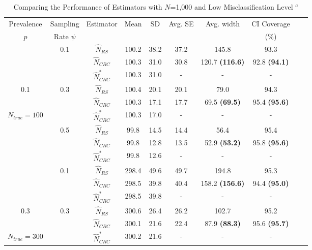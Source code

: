 \documentclass[useAMS,usenatbib,referee]{biom}
\begin{document}
\begin{table}
    \centering
    \caption{Comparing the Performance of Estimators with $N$=1,000 and Low Misclassification Level $^a$ }
    \label{table_2}
    \begin{threeparttable}[b]
    \begin{tabular}{cccccccccc}
    \hline
    Prevalence & 
    Sampling &  \multirow{2}{*}{Estimator \tnote{b}} & \multirow{2}{*}{Mean} & \multirow{2}{*}{SD} & \multirow{2}{*}{Avg. SE} & \multirow{2}{*}{Avg. width \tnote{c}} & CI Coverage  \\
    $p$ & Rate $\psi$ & &&&&& (\%)  \\ \hline
     & \multirow{3}{*}{0.1} & $\hat{N}_{RS}$ & 100.2 & 38.2 & 37.2 & 145.8 & 93.3  \\ \cline{3-8}
     & ~ & $\hat{N}_{CRC}$ & 100.3 & 31.0 & 30.8 & 120.7 \textbf{(116.6)} & 92.8 \textbf{(94.1)}  \\ \cline{3-8}
     & ~ & $\hat{N}_{CRC}^*$ & 100.3 & 31.0 & - & - & -   \\ \cline{2-8}
    
    0.1 & \multirow{3}{*}{0.3}  & $\hat{N}_{RS}$ & 100.4 & 20.1 & 20.1 & 79.0 & 94.3  \\ \cline{3-8}
     & ~ & $\hat{N}_{CRC}$ & 100.3 & 17.1 & 17.7 & 69.5 \textbf{(69.5)} & 95.4 \textbf{(95.6)}  \\ \cline{3-8}
    $N_{true}=100$ & ~ & $\hat{N}_{CRC}^*$ & 100.3 & 17.0 & - & - & -   \\  \cline{2-8}
    
     & \multirow{3}{*}{0.5}  & $\hat{N}_{RS}$ & 99.8 & 14.5 & 14.4 & 56.4 & 95.4   \\ \cline{3-8}
     & ~ & $\hat{N}_{CRC}$ & 99.8 & 12.8 & 13.5 & 52.9 \textbf{(53.2)} & 95.8 \textbf{(95.6)}   \\ \cline{3-8}
    ~ & ~ & $\hat{N}_{CRC}^*$ & 99.8 & 12.6 & - & - & -   \\ \hline
    
    & \multirow{3}{*}{0.1} & $\hat{N}_{RS}$ & 298.4 & 49.6 & 49.7 & 194.8 & 95.3  \\ \cline{3-8}
     & ~ & $\hat{N}_{CRC}$ &  298.5 & 39.8 & 40.4 & 158.2 \textbf{(156.6)} & 94.4 \textbf{(95.0)}  \\ \cline{3-8}
    ~ & ~ & $\hat{N}_{CRC}^*$ & 298.5 & 39.8 & - & - & -   \\ \cline{2-8}
    
    0.3 & \multirow{3}{*}{0.3}  & $\hat{N}_{RS}$ & 300.6 & 26.4 & 26.2 & 102.7 & 95.2  \\ \cline{3-8}
     & ~ & $\hat{N}_{CRC}$ & 300.1 & 21.6 & 22.4 & 87.9 \textbf{(88.3)} & 95.6 \textbf{(95.7)}  \\ \cline{3-8}
     $N_{true}=300$ & ~ & $\hat{N}_{CRC}^*$ & 300.2 & 21.6 & - & - & -   \\ \cline{2-8}
    

\end{tabular}
\end{threeparttable}
\end{table}
\end{document}
